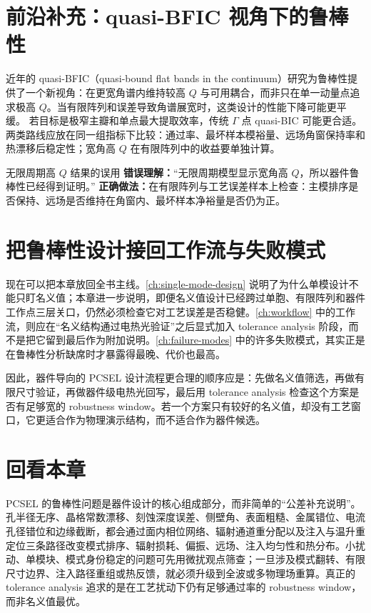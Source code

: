 \section{前沿补充：quasi-BFIC 视角下的鲁棒性}
近年的 quasi-BFIC（quasi-bound flat bands in the continuum）研究为鲁棒性提供了一个新视角：在更宽角谱内维持较高 $Q$ 与可用耦合，而非只在单一动量点追求极高 $Q$。当有限阵列和误差导致角谱展宽时，这类设计的性能下降可能更平缓\cite{qin2025quasibfic,koshelev2018quasibic}。
若目标是极窄主瓣和单点最大提取效率，传统 $\Gamma$ 点 quasi-BIC 可能更合适。两类路线应放在同一组指标下比较：通过率、最坏样本模裕量、远场角窗保持率和热漂移后稳定性；宽角高 $Q$ 在有限阵列中的收益要单独计算\cite{wang2025finitesizepcsel}。

\begin{CommonPitfallBox}{无限周期高 \texorpdfstring{$Q$}{Q} 结果的误用}
\textbf{错误理解：}“无限周期模型显示宽角高 $Q$，所以器件鲁棒性已经得到证明。”
\textbf{正确做法：}在有限阵列与工艺误差样本上检查：主模排序是否保持、远场是否维持在角窗内、最坏样本净裕量是否仍为正。
\end{CommonPitfallBox}

\FiniteSizeReportTemplate

\section{把鲁棒性设计接回工作流与失败模式}
现在可以把本章放回全书主线。\cref{ch:single-mode-design} 说明了为什么单模设计不能只盯名义值；本章进一步说明，即便名义值设计已经跨过单胞、有限阵列和器件工作点三层关口，仍然必须检查它对工艺误差是否稳健。\cref{ch:workflow} 中的工作流，则应在“名义结构通过电热光验证”之后显式加入 tolerance analysis 阶段，而不是把它留到最后作为附加说明。\cref{ch:failure-modes} 中的许多失败模式，其实正是在鲁棒性分析缺席时才暴露得最晚、代价也最高。

因此，器件导向的 PCSEL 设计流程更合理的顺序应是：先做名义值筛选，再做有限尺寸验证，再做器件级电热光回写，最后用 tolerance analysis 检查这个方案是否有足够宽的 robustness window。若一个方案只有较好的名义值，却没有工艺窗口，它更适合作为物理演示结构，而不适合作为器件候选。

\section*{回看本章}
PCSEL 的鲁棒性问题是器件设计的核心组成部分，而非简单的“公差补充说明”。孔半径无序、晶格常数漂移、刻蚀深度误差、侧壁角、表面粗糙、金属错位、电流孔径错位和边缘截断，都会通过面内相位网络、辐射通道重分配以及注入与温升重定位三条路径改变模式排序、辐射损耗、偏振、远场、注入均匀性和热分布。小扰动、单模块、模式身份稳定的问题可先用微扰观点筛查；一旦涉及模式翻转、有限尺寸边界、注入路径重组或热反馈，就必须升级到全波或多物理场重算。真正的 tolerance analysis 追求的是在工艺扰动下仍有足够通过率的 robustness window，而非名义值最优。

